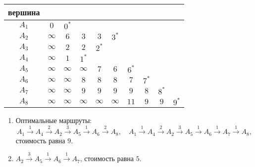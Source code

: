 \documentclass[12pt]{article}
\begin{document}
\begin{enumerate}
    \begin{tabular}{cccccccccc}
        \toprule
        вершина & & & & & & & & &  \\
        \midrule
        $A_1$ & $0$ & $0^*$ & & & & & & &  \\
        $A_2$ & $\infty$ & $6$ & $3$ & $3$ & $3^*$ & & & & \\
        $A_3$ & $\infty$ & $2$ & $2$ & $2^*$ &  & & & & \\
        $A_4$ & $\infty$ & $1$ & $1^*$ &  &  & & & & \\
        $A_5$ & $\infty$ & $\infty$ & $\infty$ & $7$ & $6$ & $6^*$ & & & \\
        $A_6$ & $\infty$ & $\infty$ & $8$ & $8$ & $8$ & $7$ & $7^*$ & & \\
        $A_7$ & $\infty$ & $\infty$ & $9$ & $9$ & $9$ & $9$ & $8$ & $8^*$ & \\
        $A_8$ & $\infty$ & $\infty$ & $\infty$ & $\infty$ & $\infty$ & $11$ & $9$ & $9$ & $9^*$ \\
        \bottomrule
    \end{tabular}
    \begin{enumerate}
        \item Оптимальные маршруты:   
        \[
        A_1 \overset{1}{\to} A_4 \overset{2}{\to} A_2 \overset{3}{\to} A_5 
        \overset{1}{\to} A_6 \overset{2}{\to} A_8, \quad        
        A_1 \overset{1}{\to} A_4 \overset{2}{\to} A_2 \overset{3}{\to} A_5 
        \overset{1}{\to} A_6 \overset{1}{\to} A_7 \overset{1}{\to} A_8, 
        \]
        стоимость равна $9$.
        \item $A_2 \overset{3}{\to} A_5 \overset{1}{\to} A_6 \overset{1}{\to} A_7$, стоимость равна $5$.
    \end{enumerate}

\end{enumerate}
\end{document}
